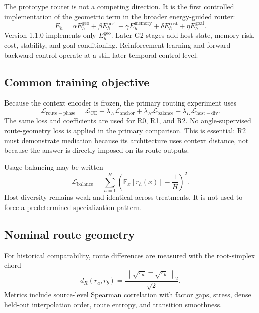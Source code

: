 \documentclass[11pt,a4paper]{article}
\newcommand{\E}{\mathbb{E}}
\newcommand{\loss}{\mathcal{L}}
\newcommand{\norm}[1]{\left\lVert #1 \right\rVert}
\begin{document}
\begin{positivebox}
The prototype router is not a competing direction. It is the first controlled implementation of the geometric term in the broader energy-guided router:
\begin{equation}
 E_h=\alpha E_h^{\mathrm{geo}}+\beta E_h^{\mathrm{host}}+
 \gamma E_h^{\mathrm{memory}}+\delta E_h^{\mathrm{cost}}+
 \eta E_h^{\mathrm{goal}}.
\end{equation}
Version 1.1.0 implements only $E_h^{\mathrm{geo}}$. Later G2 stages add host state, memory risk, cost, stability, and goal conditioning. Reinforcement learning and forward--backward control operate at a still later temporal-control level.
\end{positivebox}

\subsection{Common training objective}

Because the context encoder is frozen, the primary routing experiment uses
\begin{equation}
 \loss_{\mathrm{route-phase}}=
 \loss_{\mathrm{CE}}
 +\lambda_A\loss_{\mathrm{anchor}}
 +\lambda_B\loss_{\mathrm{balance}}
 +\lambda_D\loss_{\mathrm{host-div}}.
\end{equation}
The same loss and coefficients are used for R0, R1, and R2. No angle-supervised route-geometry loss is applied in the primary comparison. This is essential: R2 must demonstrate mediation because its architecture uses context distance, not because the answer is directly imposed on its route outputs.

Usage balancing may be written
\begin{equation}
 \loss_{\mathrm{balance}}=
 \sum_{h=1}^{H}
 \left(\E_x[r_h(x)]-\frac1H\right)^2.
\end{equation}
Host diversity remains weak and identical across treatments. It is not used to force a predetermined specialization pattern.

\subsection{Nominal route geometry}

For historical comparability, route differences are measured with the root-simplex chord
\begin{equation}
 d_R(r_a,r_b)=\frac{\norm{\sqrt{r_a}-\sqrt{r_b}}_2}{\sqrt2}.
\end{equation}
Metrics include source-level Spearman correlation with factor gaps, stress, dense held-out interpolation order, route entropy, and transition smoothness.
\end{document}
